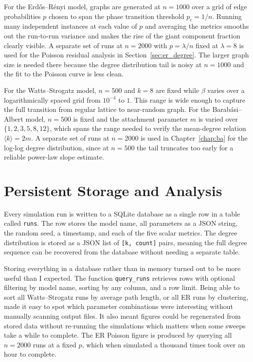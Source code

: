 \documentclass[12pt, a4paper]{report}
\theoremstyle{definition}
\theoremstyle{plain}
\theoremstyle{remark}
\begin{document}
For the Erd\H{o}s--R\'{e}nyi model, graphs are generated at $n = 1000$
over a grid of edge probabilities $p$ chosen to span the phase transition
threshold $p_c = 1/n$. Running many independent instances at each value
of $p$ and averaging the metrics smooths out the run-to-run variance
and makes the rise of the giant component fraction clearly visible.
A separate set of runs at $n = 2000$ with $p = \lambda / n$ fixed at
$\lambda = 8$ is used for the Poisson residual analysis in
Section~\ref{sec:er_degree}. The larger graph size is needed there
because the degree distribution tail is noisy at $n = 1000$ and the
fit to the Poisson curve is less clean.

For the Watts--Strogatz model, $n = 500$ and $k = 8$ are fixed while
$\beta$ varies over a logarithmically spaced grid from $10^{-4}$ to $1$.
This range is wide enough to capture the full transition from regular
lattice to near-random graph. For the Barab\'asi--Albert model, $n = 500$
is fixed and the attachment parameter $m$ is varied over
$\{1, 2, 3, 5, 8, 12\}$, which spans the range needed to verify the
mean-degree relation $\langle k \rangle = 2m$. A separate set of runs at
$n = 2000$ is used in Chapter~\ref{chap:ba} for the log-log degree
distribution, since at $n = 500$ the tail truncates too early for a
reliable power-law slope estimate.

\section{Persistent Storage and Analysis}
\label{sec:storage}

Every simulation run is written to a SQLite database as a single row in
a table called \texttt{runs}. The row stores the model name, all
parameters as a JSON string, the random seed, a timestamp, and each of
the five scalar metrics. The degree distribution is stored as a JSON
list of \texttt{[k, count]} pairs, meaning the full degree sequence can
be recovered from the database without needing a separate table.

Storing everything in a database rather than in memory turned out to be
more useful than I expected. The function \texttt{query\_runs} retrieves
rows with optional filtering by model name, sorting by any column, and
a row limit. Being able to sort all Watts--Strogatz runs by average path
length, or all ER runs by clustering, made it easy to spot which
parameter combinations were interesting without manually scanning output
files. It also meant figures could be regenerated from stored data
without re-running the simulations which matters when some sweeps
take a while to complete. The ER Poisson figure is
produced by querying all $n = 2000$ runs at a fixed $p$, which when simulated
a thousand times took over an hour to complete.
\end{document}
